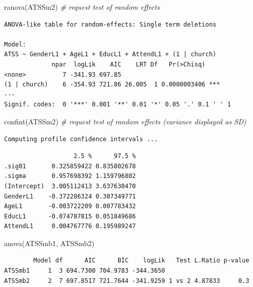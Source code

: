 \documentclass[
  english,
]{book}
\newenvironment{Shaded}{\begin{snugshade}}{\end{snugshade}}
\newcommand{\CommentTok}[1]{\textcolor[rgb]{0.56,0.35,0.01}{\textit{#1}}}
\newcommand{\FunctionTok}[1]{\textcolor[rgb]{0.00,0.00,0.00}{#1}}
\newcommand{\NormalTok}[1]{#1}
\begin{document}
\begin{Shaded}
\begin{Highlighting}[]
\FunctionTok{ranova}\NormalTok{(ATSSm2) }\CommentTok{\# request test of random effects}
\end{Highlighting}
\end{Shaded}

\begin{verbatim}
ANOVA-like table for random-effects: Single term deletions

Model:
ATSS ~ GenderL1 + AgeL1 + EducL1 + AttendL1 + (1 | church)
             npar  logLik    AIC    LRT Df   Pr(>Chisq)    
<none>          7 -341.93 697.85                           
(1 | church)    6 -354.93 721.86 26.005  1 0.0000003406 ***
---
Signif. codes:  0 '***' 0.001 '**' 0.01 '*' 0.05 '.' 0.1 ' ' 1
\end{verbatim}

\begin{Shaded}
\begin{Highlighting}[]
\FunctionTok{confint}\NormalTok{(ATSSm2) }\CommentTok{\# request test of random effects (variance displayed as SD)}
\end{Highlighting}
\end{Shaded}

\begin{verbatim}
Computing profile confidence intervals ...
\end{verbatim}

\begin{verbatim}
                   2.5 %      97.5 %
.sig01       0.325859422 0.835802678
.sigma       0.957698392 1.159796802
(Intercept)  3.005112413 3.637630470
GenderL1    -0.372286324 0.307349771
AgeL1       -0.003722209 0.007783432
EducL1      -0.074787815 0.051849686
AttendL1     0.004767776 0.195989247
\end{verbatim}

\begin{Shaded}
\begin{Highlighting}[]
\FunctionTok{anova}\NormalTok{(ATSSmb1, ATSSmb2) }
\end{Highlighting}
\end{Shaded}

\begin{verbatim}
        Model df      AIC      BIC    logLik   Test L.Ratio p-value
ATSSmb1     1  3 694.7300 704.9783 -344.3650                       
ATSSmb2     2  7 697.8517 721.7644 -341.9259 1 vs 2 4.87833     0.3
\end{verbatim}
\end{document}
